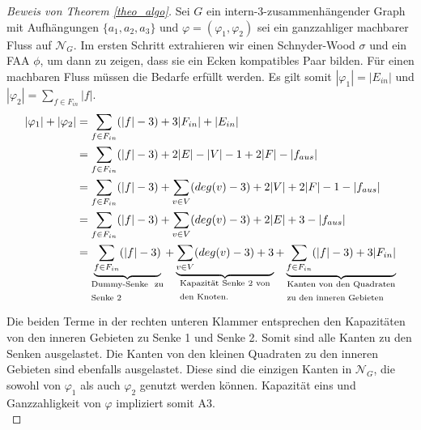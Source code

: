 \begin{proof}[Beweis von Theorem \ref{theo_algo}]
Sei $G$ ein intern-3-zusammenhängender Graph mit Aufhängungen $\{a_1,a_2,a_3\}$ und $\varphi=(\varphi_1,\varphi_2)$ sei ein ganzzahliger machbarer Fluss auf $\mathcal{N}_G$. Im ersten Schritt extrahieren wir einen Schnyder-Wood $\sigma$ und ein FAA $\phi$, um dann zu zeigen, dass sie ein Ecken kompatibles Paar bilden. Für einen machbaren Fluss müssen die Bedarfe erfüllt werden. Es gilt somit $|\varphi_1| =  |E_{in}|$ und $|\varphi_2| = \sum_{f \in F_{in}} |f|$.
\begin{equation}\label{eq_sat}
\begin{split}
|\varphi_1| + |\varphi_2| & = \sum_{f \in F_{in}} (|f|-3) + 3|F_{in}| + |E_{in}|\\
		& = \sum_{f \in F_{in}} (|f|-3) + 2|E| -|V| - 1 + 2|F| - |f_{aus}|\\
		& = \sum_{f \in F_{in}} (|f|-3) + \sum_{v \in V} (deg(v)-3) + 2|V| + 2|F| - 1 - |f_{aus}|\\
		& = \sum_{f \in F_{in}} (|f|-3) + \sum_{v \in V} (deg(v)-3) + 2|E| + 3 - |f_{aus}|\\
		& = \underbrace{\sum_{f \in F_{in}}(|f|-3)  }_{\text{\parbox{8em}{Dummy-Senke zu Senke 2}}} + \underbrace{\sum_{v \in V} (deg(v)-3) +3 }_{\text{\parbox{10em}{Kapazität Senke 2 von den Knoten.}}} +\underbrace{\sum_{f \in F_{in}}(|f|-3) + 3|F_{in}|}_{\text{\parbox{12em}{Kanten von den Quadraten zu den inneren Gebieten}}}
\end{split}
\end{equation}

Die beiden Terme in der rechten unteren Klammer entsprechen den Kapazitäten von den inneren Gebieten zu Senke 1 und Senke 2. Somit sind alle Kanten zu den Senken ausgelastet. Die Kanten von den kleinen Quadraten zu den inneren Gebieten sind ebenfalls ausgelastet. Diese sind die einzigen Kanten in $\mathcal{N}_G$, die sowohl von $\varphi_1$ als auch $\varphi_2$ genutzt werden können. Kapazität eins und Ganzzahligkeit von $\varphi$ impliziert somit A3.\\


\end{proof}
